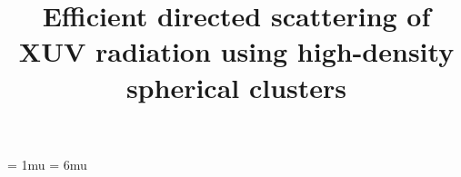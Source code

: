 \documentclass[10pt]{article}
\begin{document}



	\pagestyle{fancy}
	\fancyhf{}
	\fancyhead[L]{\textit{\nouppercase{\leftmark}}}
	\fancyfoot[C]{\thepage}

	\thinmuskip = 1mu
	\thickmuskip = 6mu
	\def\stacktype{S}\Sstackgap=-4.3pt


	\renewcommand{\equationautorefname}{}


	\title{Efficient directed scattering of XUV radiation using high-density spherical clusters}
	\author{}
	\maketitle

	
	
	
	


	
	
\end{document}
